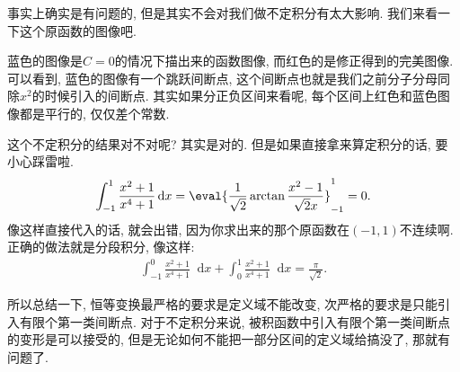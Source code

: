 \documentclass{ctexbook}
\newcommand*{\dif}{\mathop{}\!\mathrm{d}}
\begin{document}
{事实上确实是有问题的, 但是其实不会对我们做不定积分有太大影响. 我们来看一下这个原函数的图像吧. 
\begin{center}
\end{center}\par
蓝色的图像是$C=0$的情况下描出来的函数图像, 而红色的是修正得到的完美图像. 可以看到, 蓝色的图像有一个跳跃间断点, 这个间断点也就是我们之前分子分母同除$x^{2}$的时候引入的间断点. 其实如果分正负区间来看呢, 每个区间上红色和蓝色图像都是平行的, 仅仅差个常数. \par
这个不定积分的结果对不对呢? 其实是对的. 但是如果直接拿来算定积分的话, 要小心踩雷啦. 
\begin{align*}
\int_{-1}^{1}\frac{x^{2}+1}{x^{4}+1}\dif{x}=\eval{\frac{1}{\sqrt{2}}\arctan{\frac{x^{2}-1}{\sqrt{2}x}}}_{-1}^{1}=0
.\end{align*}
像这样直接代入的话, 就会出错, 因为你求出来的那个原函数在$\left(-1,1\right)$不连续啊. 正确的做法就是分段积分, 像这样: 
\begin{align*}
\int_{-1}^{0}\frac{x^{2}+1}{x^{4}+1}\dif{x}+\int_{0}^{1}\frac{x^{2}+1}{x^{4}+1}\dif{x}=\frac{\pi}{\sqrt{2}}
.\end{align*}\par
所以总结一下, 恒等变换最严格的要求是定义域不能改变, 次严格的要求是只能引入有限个第一类间断点. 对于不定积分来说, 被积函数中引入有限个第一类间断点的变形是可以接受的, 但是无论如何不能把一部分区间的定义域给搞没了, 那就有问题了. \par
}
\end{document}
